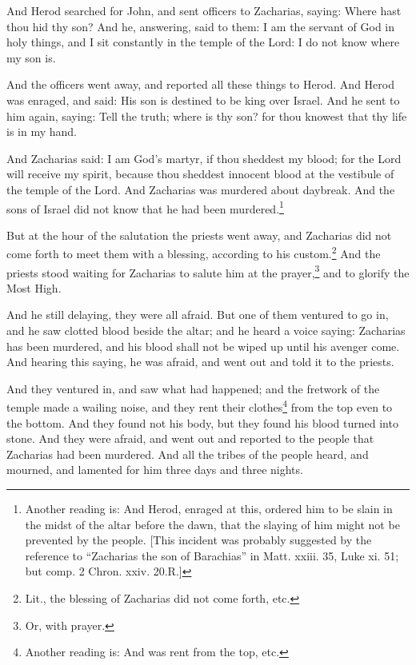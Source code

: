\pend\pstart
{}

\pend\setcounter{pstartR}{1}\pstart
And Herod searched for John, and sent officers to Zacharias, saying: Where hast thou hid thy son? And he, answering, said to them: I am the servant of God in holy things, and I sit constantly in the temple of the Lord: I do not know where my son is.

\pend\pstart
And the officers went away, and reported all these things to Herod. And Herod was enraged, and said: His son is destined to be king over Israel. And he sent to him again, saying: Tell the truth; where is thy son? for thou knowest that thy life is in my hand.

\pend\pstart
And Zacharias said: I am God's martyr, if thou sheddest my blood; for the Lord will receive my spirit, because thou sheddest innocent blood at the vestibule of the temple of the Lord. And Zacharias was murdered about daybreak. And the sons of Israel did not know that he had been murdered.\footnote{Another reading is: And Herod, enraged at this, ordered him to be slain in the midst of the altar before the dawn, that the slaying of him might not be prevented by the people. [This incident was probably suggested by the reference to ``Zacharias the son of Barachias'' in Matt. xxiii. 35, Luke xi. 51; but comp. 2 Chron. xxiv. 20.\textemdash R.]}

\pend\pstart
{}

\pend\setcounter{pstartR}{1}\pstart
But at the hour of the salutation the priests went away, and Zacharias did not come forth to meet them with a blessing, according to his custom.\footnote{Lit., the blessing of Zacharias did not come forth, etc.} And the priests stood waiting for Zacharias to salute him at the prayer,\footnote{Or, with prayer.} and to glorify the Most High.

\pend\pstart
And he still delaying, they were all afraid. But one of them ventured to go in, and he saw clotted blood beside the altar; and he heard a voice saying: Zacharias has been murdered, and his blood shall not be wiped up until his avenger come. And hearing this saying, he was afraid, and went out and told it to the priests.

\pend\pstart
And they ventured in, and saw what had happened; and the fretwork of the temple made a wailing noise, and they rent their clothes\footnote{Another reading is: And was rent from the top, etc.} from the top even to the bottom. And they found not his body, but they found his blood turned into stone. And they were afraid, and went out and reported to the people that Zacharias had been murdered. And all the tribes of the people heard, and mourned, and lamented for him three days and three nights.


